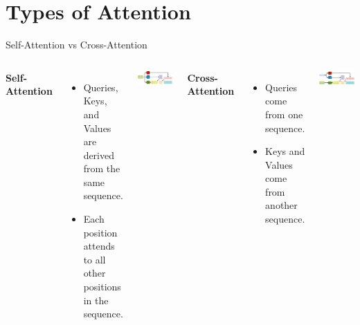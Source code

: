 \documentclass[serif, aspectratio=169]{beamer}
\begin{document}
\section{Types of Attention}
\begin{frame}{Self-Attention vs Cross-Attention}
	\begin{columns}
		\textbf{Self-Attention}
		\begin{itemize}
			\item Queries, Keys, and Values are derived from the same sequence.
			\item Each position attends to all other positions in the sequence.
		\end{itemize}
		\vspace{0.5em}
		\includegraphics[width=\textwidth]{pic/self-attention.png}
		
		\textbf{Cross-Attention}
		\begin{itemize}
			\item Queries come from one sequence.
			\item Keys and Values come from another sequence.
		\end{itemize}
		\vspace{0.5em}
		\includegraphics[width=\textwidth]{pic/cross-attention.png}
	\end{columns}
\vspace{5pt}
\vfill
{}
\end{frame}
\end{document}
